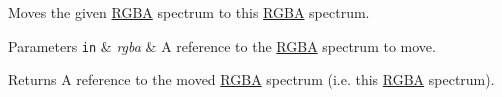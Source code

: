 Moves the given \hyperlink{structmage_1_1_r_g_b_a}{R\+G\+BA} spectrum to this \hyperlink{structmage_1_1_r_g_b_a}{R\+G\+BA} spectrum.


\begin{DoxyParams}[1]{Parameters}
\mbox{\tt in}  & {\em rgba} & A reference to the \hyperlink{structmage_1_1_r_g_b_a}{R\+G\+BA} spectrum to move. \\
\hline
\end{DoxyParams}
\begin{DoxyReturn}{Returns}
A reference to the moved \hyperlink{structmage_1_1_r_g_b_a}{R\+G\+BA} spectrum (i.\+e. this \hyperlink{structmage_1_1_r_g_b_a}{R\+G\+BA} spectrum). 
\end{DoxyReturn}
